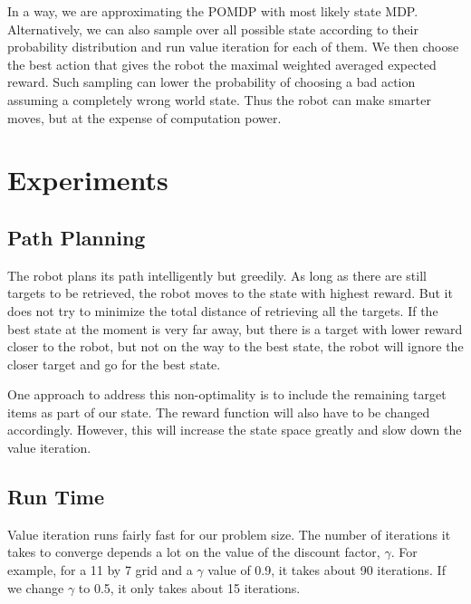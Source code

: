 \documentclass{pset}
\begin{document}
In a way, we are approximating the POMDP with most likely state MDP. Alternatively, we can also
sample over all possible state according to their probability distribution and run value iteration
for each of them. We then choose the best action that gives the robot the maximal weighted averaged
    expected reward. Such sampling can lower the probability of choosing a bad action assuming a
    completely wrong world state. Thus the robot can make smarter moves, but at the expense of
    computation power.

\section{Experiments}
\label{sec:experiments}

\subsection{Path Planning}
The robot plans its path intelligently but greedily. As long as there are still targets to be
retrieved, the robot moves to the state with highest reward. But it does not try to minimize the
total distance of retrieving all the targets. If the best state at the moment is very far away, but
there is a target with lower reward closer to the robot, but not on the way to the best state, the
robot will ignore the closer target and go for the best state.

One approach to address this non-optimality is to include the remaining target items as part of our state.
The reward function will also have to be changed accordingly. However, this will increase the state
space greatly and slow down the value iteration.


\subsection{Run Time}
Value iteration runs fairly fast for our problem size. The number of iterations it takes to converge
depends a lot on the value of the discount factor, $\gamma$. For example, for a 11 by 7 grid and a
$\gamma$ value of 0.9, it takes about 90 iterations. If we change $\gamma$ to 0.5, it only takes about
15 iterations.




\end{document}
